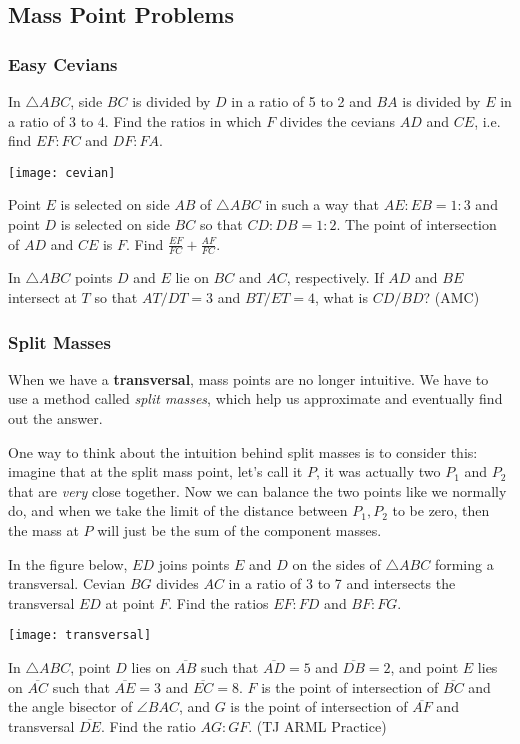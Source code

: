 \subsection{Mass Point Problems}
\subsubsection{Easy Cevians}
\begin{problem}
In $\triangle ABC$, side $BC$ is divided by $D$ in a ratio of 5 to 2 and $BA$ is divided by $E$ in a ratio of 3 to 4. Find the ratios in which $F$ divides the cevians $AD$ and $CE$, i.e. find $EF : FC$ and $DF : FA$.
\begin{center}
	\texttt{[image: cevian]}
	\end{center}
\end{problem}
\begin{problem}
Point $E$ is selected on side $AB$ of $\triangle ABC$ in such a way that $AE : EB = 1 : 3$ and point $D$ is selected on side $BC$ so that $CD : DB = 1 : 2$. The point of intersection of $AD$ and $CE$ is $F$. Find $\frac{EF}{FC}+\frac{AF}{FC}$.
\end{problem}
\begin{problem}
In $\triangle ABC$ points $D$ and $E$ lie on $BC$ and $AC$, respectively. If $AD$ and $BE$ intersect at $T$ so that $AT/DT=3$ and $BT/ET=4$, what is $CD/BD$? (AMC)
\end{problem}

\subsubsection{Split Masses}
When we have a \textbf{transversal}, mass points are no longer intuitive. We have to use a method called \textit{split masses}, which help us approximate and eventually find out the answer. 

One way to think about the intuition behind split masses is to consider this: imagine that at the split mass point, let's call it $P$, it was actually two $P_1$ and $P_2$ that are \textit{very} close together. Now we can balance the two points like we normally do, and when we take the limit of the distance between $P_1,P_2$ to be zero, then the mass at $P$ will just be the sum of the component masses.
\begin{problem}
    In the figure below, $ED$ joins points $E$ and $D$ on the sides of $\triangle ABC$ forming a transversal. Cevian $BG$ divides $AC$ in a ratio of 3 to 7 and intersects the transversal $ED$ at point $F$. Find the ratios $EF : FD$ and $BF : FG$.
    \begin{center}
	\texttt{[image: transversal]}
	\end{center}
\end{problem}
\begin{problem}
In $\triangle ABC$, point $D$ lies on $\overline{AB}$ such that $\overline{AD}=5$ and $\overline{DB}=2$, and point $E$ lies on $\overline{AC}$ such that $\overline{AE}=3$ and $\overline{EC}=8$. $F$ is the point of intersection of $\overline{BC}$ and the angle bisector of $\angle BAC$, and $G$ is the point of intersection of $\overline{AF}$ and transversal $\overline{DE}$. Find the ratio $AG:GF$. (TJ ARML Practice)
\end{problem}
